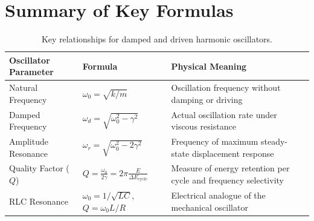 \section{Summary of Key Formulas}
\begin{table}[H]
\centering
\small
\begin{tabularx}{\textwidth}{llX}
\toprule
\textbf{Oscillator Parameter} & \textbf{Formula} & \textbf{Physical Meaning} \\
\midrule
Natural Frequency & $\omega_0 = \sqrt{k/m}$ & Oscillation frequency without damping or driving \\
Damped Frequency & $\omega_d = \sqrt{\omega_0^2 - \gamma^2}$ & Actual oscillation rate under viscous resistance \\
Amplitude Resonance & $\omega_r = \sqrt{\omega_0^2 - 2\gamma^2}$ & Frequency of maximum steady-state displacement response \\
Quality Factor ($Q$) & $Q = \frac{\omega_0}{2\gamma} = 2\pi \frac{E}{\Delta E_{\text{cycle}}}$ & Measure of energy retention per cycle and frequency selectivity \\
RLC Resonance & $\omega_0 = 1/\sqrt{LC}$, $Q = \omega_0 L/R$ & Electrical analogue of the mechanical oscillator \\
\bottomrule
\end{tabularx}
\caption{Key relationships for damped and driven harmonic oscillators.}
\label{tab:ch09_summary}
\end{table}

